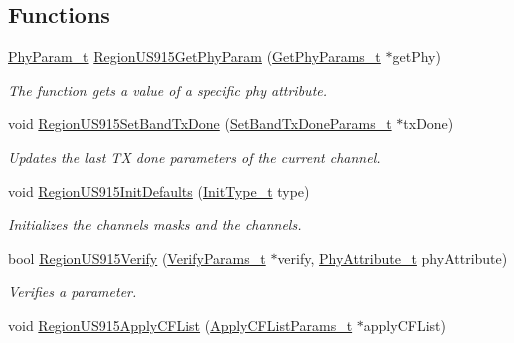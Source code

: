 \subsection*{Functions}
\begin{DoxyCompactItemize}
\item 
\hyperlink{group__REGION_gaed159b26e5c4677236b6e8677019db30}{Phy\+Param\+\_\+t} \hyperlink{group__REGIONUS915_ga644569c2f1367a399ff93a81f160a7d9}{Region\+U\+S915\+Get\+Phy\+Param} (\hyperlink{group__REGION_gab471483fff904f4f89bbc03f7fc380ab}{Get\+Phy\+Params\+\_\+t} $\ast$get\+Phy)
\begin{DoxyCompactList}\small\item\em The function gets a value of a specific phy attribute. \end{DoxyCompactList}\item 
void \hyperlink{group__REGIONUS915_ga821c323447c6cadc64cd2d25725782c0}{Region\+U\+S915\+Set\+Band\+Tx\+Done} (\hyperlink{group__REGION_gad0524aa0673c0814a71e7a4f9cade3fc}{Set\+Band\+Tx\+Done\+Params\+\_\+t} $\ast$tx\+Done)
\begin{DoxyCompactList}\small\item\em Updates the last TX done parameters of the current channel. \end{DoxyCompactList}\item 
void \hyperlink{group__REGIONUS915_ga099942705729797728a84270350aac78}{Region\+U\+S915\+Init\+Defaults} (\hyperlink{group__REGION_gaddc73ae10673ec925724e7870363bda9}{Init\+Type\+\_\+t} type)
\begin{DoxyCompactList}\small\item\em Initializes the channels masks and the channels. \end{DoxyCompactList}\item 
bool \hyperlink{group__REGIONUS915_ga2c010d2640341d3e0690d91ac66bc921}{Region\+U\+S915\+Verify} (\hyperlink{group__REGION_ga966d97bc2f25df1c09e92e60ef652276}{Verify\+Params\+\_\+t} $\ast$verify, \hyperlink{group__REGION_ga9445b07fdf77581ecfaf389970e635f8}{Phy\+Attribute\+\_\+t} phy\+Attribute)
\begin{DoxyCompactList}\small\item\em Verifies a parameter. \end{DoxyCompactList}\item 
void \hyperlink{group__REGIONUS915_ga072949ee3a416e1bfbe2b3a2c478b13b}{Region\+U\+S915\+Apply\+C\+F\+List} (\hyperlink{group__REGION_ga71588e9ad07e34b78fa91d51881fd3c6}{Apply\+C\+F\+List\+Params\+\_\+t} $\ast$apply\+C\+F\+List)

\end{DoxyCompactItemize}
